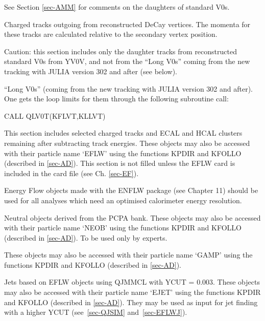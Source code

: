 \begin{indentlist}{ 2.00cm}{ 2.25cm}

See Section
\ref{sec-AMM} for comments on the daughters of standard V0s.
 

Charged tracks outgoing from reconstructed DeCay vertices. The momenta
for these tracks are calculated relative to the secondary
vertex position.

 Caution: this section includes only the daughter tracks from
reconstructed standard V0s from YV0V, and not from the ``Long V0s'' 
coming from the new tracking with JULIA version 302 and after (see below).


 ``Long V0s'' (coming from the new tracking with JULIA version 302 and after). 
One gets the loop limits for them through the following subroutine call:

 CALL QLV0T(KFLVT,KLLVT)                               
                                           
 

This section includes selected charged tracks
and ECAL and HCAL clusters remaining after subtracting
track energies. These objects
may also be accessed with their particle name `EFLW' using
the functions KPDIR and KFOLLO (described in
\ref{sec-AD}).
This section is not
filled unless the EFLW card is included in the card file
(see Ch. \ref{sec-EF}).

Energy Flow objects made with the ENFLW package (see Chapter 11)
should be used for all analyses which need an optimised calorimeter 
energy resolution.

Neutral objects derived from the PCPA bank.  These objects
may also be accessed with their particle name `NEOB' using
the functions KPDIR and KFOLLO (described in
\ref{sec-AD}). To be used only by experts.
 

These objects
may also be accessed with their particle name `GAMP' using
the functions KPDIR and KFOLLO (described in
\ref{sec-AD}).
 

Jets based on EFLW objects using QJMMCL with
YCUT = 0.003.
These objects
may also be accessed with their particle name `EJET' using
the functions KPDIR and KFOLLO (described in
\ref{sec-AD}). They may be used as input for jet finding
with a higher YCUT (see~\ref{sec-QJSIM} and~\ref{sec-EFLWJ}).
 
\end{indentlist}
 
